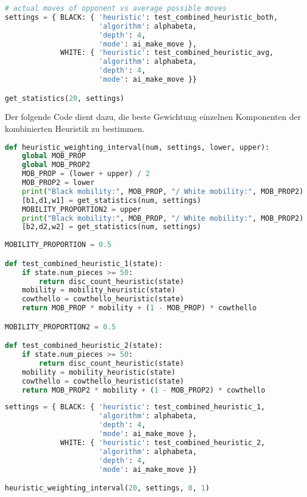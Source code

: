 \begin{lstlisting}[language=Python]
# actual moves of opponent vs average possible moves
settings = { BLACK: { 'heuristic': test_combined_heuristic_both,
                      'algorithm': alphabeta,
                      'depth': 4,
                      'mode': ai_make_move },
             WHITE: { 'heuristic': test_combined_heuristic_avg,
                      'algorithm': alphabeta,
                      'depth': 4,
                      'mode': ai_make_move }}

get_statistics(20, settings)
\end{lstlisting}

Der folgende Code dient dazu, die beste Gewichtung einzelnen Komponenten
der kombinierten Heuristik zu bestimmen.

\begin{lstlisting}[language=Python]
def heuristic_weighting_interval(num, settings, lower, upper):
    global MOB_PROP
    global MOB_PROP2
    MOB_PROP = (lower + upper) / 2
    MOB_PROP2 = lower
    print("Black mobility:", MOB_PROP, "/ White mobility:", MOB_PROP2)
    [b1,d1,w1] = get_statistics(num, settings)
    MOBILITY_PROPORTION2 = upper
    print("Black mobility:", MOB_PROP, "/ White mobility:", MOB_PROP2)
    [b2,d2,w2] = get_statistics(num, settings)
    
MOBILITY_PROPORTION = 0.5

def test_combined_heuristic_1(state):
    if state.num_pieces >= 50:
        return disc_count_heuristic(state)
    mobility = mobility_heuristic(state)
    cowthello = cowthello_heuristic(state)
    return MOB_PROP * mobility + (1 - MOB_PROP) * cowthello

MOBILITY_PROPORTION2 = 0.5

def test_combined_heuristic_2(state):
    if state.num_pieces >= 50:
        return disc_count_heuristic(state)
    mobility = mobility_heuristic(state)
    cowthello = cowthello_heuristic(state)
    return MOB_PROP2 * mobility + (1 - MOB_PROP2) * cowthello
\end{lstlisting}

\begin{lstlisting}[language=Python]
settings = { BLACK: { 'heuristic': test_combined_heuristic_1,
                      'algorithm': alphabeta,
                      'depth': 4,
                      'mode': ai_make_move },
             WHITE: { 'heuristic': test_combined_heuristic_2,
                      'algorithm': alphabeta,
                      'depth': 4,
                      'mode': ai_make_move }}

heuristic_weighting_interval(20, settings, 0, 1)
\end{lstlisting}

